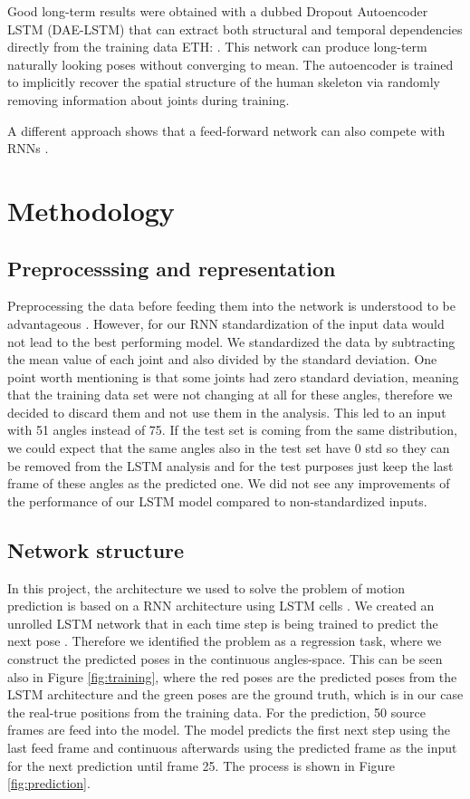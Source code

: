 Good long-term results were obtained with a dubbed Dropout Autoencoder LSTM (DAE-LSTM) that can extract both structural and temporal dependencies directly from the training data ETH: \cite{Ghosh2017}. This network can produce long-term naturally looking poses without converging to mean. The autoencoder is trained to implicitly recover the spatial structure of the human skeleton via randomly removing information about joints during training. 

A different approach shows that a feed-forward network can also compete with RNNs \cite{Buetepage2017}. 


\section{Methodology}
 
\subsection{Preprocesssing and representation}

Preprocessing the data before feeding them into the network is understood to be advantageous \cite{Fragkiadaki2014}. However, for our RNN standardization of the input data would not lead to the best performing model. We standardized the data by subtracting the mean value of each joint and also divided by the standard deviation. One point worth mentioning is that some joints had zero standard deviation, meaning that the training data set were not changing at all for these angles, therefore we decided to discard them and not use them in the analysis. This led to an input with 51 angles instead of 75. If the test set is coming from the same distribution, we could expect that the same angles also in the test set have 0 std so they can be removed from the LSTM  analysis and for the test purposes just keep the last frame of these angles as the predicted one. We did not see any improvements of the performance of our LSTM model compared to non-standardized inputs.

\subsection{Network structure}

In this project, the architecture we used to solve the problem of motion prediction is based on a RNN architecture using LSTM cells \cite{Olah2015}. We created an unrolled LSTM network that in each time step is being trained to predict the next pose . Therefore we identified the problem as a regression task, where we construct the predicted poses in the continuous angles-space. This can be seen also in Figure \ref{fig:training}, where the red poses are the predicted poses from the LSTM architecture and the green poses are the ground truth, which is in our case the real-true positions from the training data. 
For the prediction, 50 source frames are feed into the model. The model predicts the first next step using the last feed frame and continuous afterwards using the predicted frame as the input for the next prediction until frame 25. The process is shown in Figure \ref{fig:prediction}.

